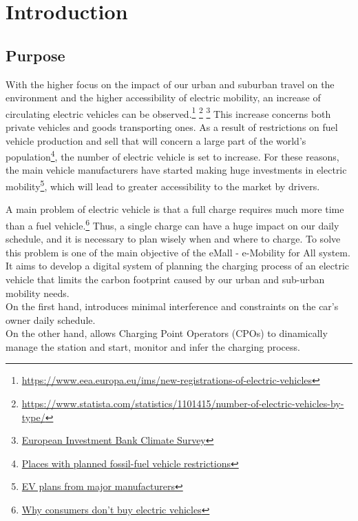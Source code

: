 \section{Introduction}\label{intro}

\subsection{Purpose}
With the higher focus on the impact of our urban and suburban travel on the environment and the higher accessibility of electric mobility, an increase of circulating electric vehicles can be observed.\footnote{\url{https://www.eea.europa.eu/ims/new-registrations-of-electric-vehicles}} \footnote{\url{https://www.statista.com/statistics/1101415/number-of-electric-vehicles-by-type/}} \footnote{\href{https://www.eib.org/en/surveys/climate-survey/4th-climate-survey/hybrid-electric-petrol-cars-flying-holidays-climate.htm}{European Investment Bank Climate Survey}}
This increase concerns both private vehicles and goods transporting ones.
As a result of restrictions on fuel vehicle production and sell that will concern a large part of the world's population\footnote{\href{https://en.wikipedia.org/wiki/Phase-out\_of\_fossil\_fuel\_vehicles\#Places\_with\_planned\_fossil-fuel\_vehicle\_restrictions}{Places with planned fossil-fuel vehicle restrictions}}, the number of
electric vehicle is set to increase. For these reasons, the main vehicle manufacturers have started making huge investments in electric mobility\footnote{\href{https://en.wikipedia.org/wiki/Electric\_car\#EV\_plans\_from\_major\_manufacturers}{EV plans from major manufacturers}}, which will lead to greater accessibility to the market by drivers.
\hfill \break

A main problem of electric vehicle is that a full charge requires much more time than a fuel vehicle.\footnote{\href{https://blinkcharging.com/fact-from-fiction-the-real-reason-why-consumers-dont-buy-electric-vehicles/?locale=en}{Why consumers don't buy electric vehicles}}
Thus, a single charge can have a huge impact on our daily schedule, and it is necessary to plan wisely when and where to charge.
To solve this problem is one of the main objective of the eMall - e-Mobility for All system.
It aims to develop a digital system of planning the charging process of an electric vehicle that limits the carbon footprint caused by our urban and
sub-urban mobility needs.\\On the first hand, introduces minimal interference
and constraints on the car's owner daily schedule.
\\On the other hand, allows Charging Point Operators (CPOs) to dinamically manage the station and start, monitor and infer the
charging process.
\hfill \break

